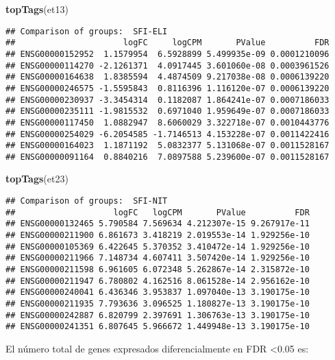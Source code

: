 \documentclass[
]{article}
\newenvironment{Shaded}{\begin{snugshade}}{\end{snugshade}}
\newcommand{\KeywordTok}[1]{\textcolor[rgb]{0.13,0.29,0.53}{\textbf{#1}}}
\newcommand{\NormalTok}[1]{#1}
\begin{document}
\begin{Shaded}
\begin{Highlighting}[]
\KeywordTok{topTags}\NormalTok{(et13)}
\end{Highlighting}
\end{Shaded}

\begin{verbatim}
## Comparison of groups:  SFI-ELI 
##                      logFC     logCPM       PValue          FDR
## ENSG00000152952  1.1579954  6.5928899 5.499935e-09 0.0001210096
## ENSG00000114270 -2.1261371  4.0917445 3.601060e-08 0.0003961526
## ENSG00000164638  1.8385594  4.4874509 9.217038e-08 0.0006139220
## ENSG00000246575 -1.5595843  0.8116396 1.116120e-07 0.0006139220
## ENSG00000230937 -3.3454314  0.1182087 1.864241e-07 0.0007186033
## ENSG00000235111 -1.9815532  0.6971040 1.959649e-07 0.0007186033
## ENSG00000117450  1.0882947  8.6060029 3.322718e-07 0.0010443776
## ENSG00000254029 -6.2054585 -1.7146513 4.153228e-07 0.0011422416
## ENSG00000164023  1.1871192  5.0832377 5.131068e-07 0.0011528167
## ENSG00000091164  0.8840216  7.0897588 5.239600e-07 0.0011528167
\end{verbatim}

\begin{Shaded}
\begin{Highlighting}[]
\KeywordTok{topTags}\NormalTok{(et23)}
\end{Highlighting}
\end{Shaded}

\begin{verbatim}
## Comparison of groups:  SFI-NIT 
##                    logFC   logCPM       PValue          FDR
## ENSG00000132465 5.790584 7.569634 4.212307e-15 9.267917e-11
## ENSG00000211900 6.861673 3.418219 2.019553e-14 1.929256e-10
## ENSG00000105369 6.422645 5.370352 3.410472e-14 1.929256e-10
## ENSG00000211966 7.148734 4.607411 3.507420e-14 1.929256e-10
## ENSG00000211598 6.961605 6.072348 5.262867e-14 2.315872e-10
## ENSG00000211947 6.780802 4.162516 8.061528e-14 2.956162e-10
## ENSG00000240041 6.436346 3.953837 1.097040e-13 3.190175e-10
## ENSG00000211935 7.793636 3.096525 1.180827e-13 3.190175e-10
## ENSG00000242887 6.820799 2.397691 1.306763e-13 3.190175e-10
## ENSG00000241351 6.807645 5.966672 1.449948e-13 3.190175e-10
\end{verbatim}

El número total de genes expresados diferencialmente en FDR
\textless0.05 es:
\end{document}

